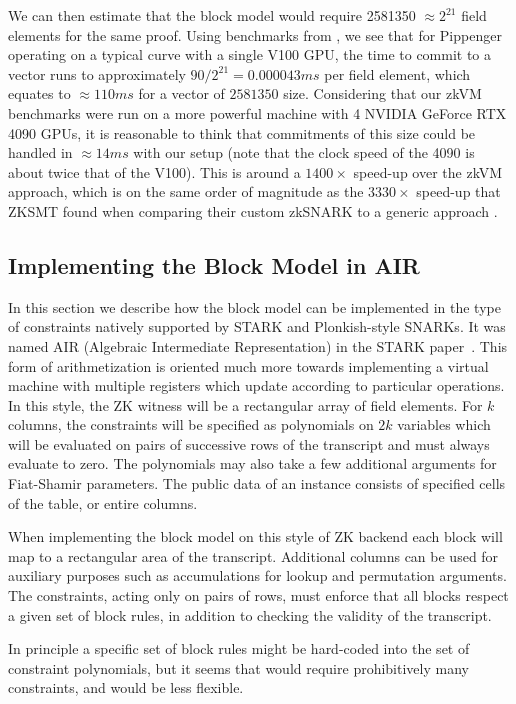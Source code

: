 \documentclass{article}
\theoremstyle{plain}
\theoremstyle{definition}
\begin{document}
We can then estimate that the block model would require 2581350 $\approx 2^{21}$ field elements for the same proof. Using benchmarks from \cite{cuzk}, we see that for Pippenger operating on a typical curve with a single V100 GPU, the time to commit to a vector runs to approximately $90/2^{21} = 0.000043ms$ per field element, which equates to $\approx 110ms$ for a vector of $2581350$ size. Considering that our zkVM benchmarks were run on a more powerful machine with 4 NVIDIA GeForce RTX 4090 GPUs, it is reasonable to think that commitments of this size could be handled in $\approx 14 ms$ with our setup (note that the clock speed of the 4090 is about twice that of the V100). This is around a $1400\times$ speed-up over the zkVM approach, which is on the same order of magnitude as the $3330\times$ speed-up that ZKSMT found when comparing their custom zkSNARK to a generic approach \cite{zksmt}.


\subsection{Implementing the Block Model in AIR}\label{block-model-implementation-air}
In this section we describe how the block model can be implemented in the
type of constraints natively supported by STARK and Plonkish-style
SNARKs.
It was named AIR (Algebraic Intermediate Representation)
in the STARK paper~\cite{BBHR18}. This form of arithmetization is oriented much more towards implementing a virtual machine with multiple registers which update according to particular operations.
In this style, the ZK witness will be a rectangular array of field elements.
For $k$ columns, the constraints will be specified as polynomials on
$2k$ variables which will be evaluated on pairs of successive rows
of the transcript and must always evaluate to zero.
The polynomials may also take a few additional arguments for Fiat-Shamir
parameters.
The public data of an instance consists of specified cells of the
table, or entire columns.

When implementing the block model on this style of ZK backend each
block will map to a rectangular area of the transcript.
Additional columns can be used for auxiliary purposes such as
accumulations for lookup and permutation arguments.
The constraints, acting only on pairs of rows, must enforce that all
blocks respect a given set of block rules, in addition to checking the
validity of the transcript.

In principle a specific set of block rules might be hard-coded into
the set of constraint polynomials, but it seems that would require
prohibitively many constraints, and would be less flexible.
\end{document}
